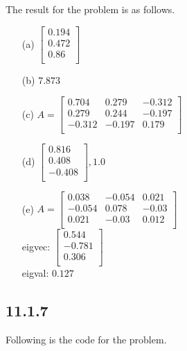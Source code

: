 \documentclass{article}
\begin{document}
The result for the problem is as follows.

\begin{enumerate}
    \item [(a)] $\begin{bmatrix} 0.194 \\ 0.472 \\ 0.86 \\  \end{bmatrix}$
    \item [(b)] $7.873$
    \item [(c)] 
    $A = \begin{bmatrix}
            0.704 & 0.279 & -0.312 \\
            0.279 & 0.244 & -0.197 \\
            -0.312 & -0.197 & 0.179 \\            
    \end{bmatrix}$
    \item [(d)] $\begin{bmatrix}  0.816 \\  0.408 \\ -0.408 \\ \end{bmatrix}, 1.0$
    \item [(e)]
    $A = \begin{bmatrix} 
            0.038 & -0.054 & 0.021 \\
            -0.054 & 0.078 & -0.03 \\
            0.021 & -0.03 & 0.012 \\
    \end{bmatrix}$ \\
    eigvec: $\begin{bmatrix} 0.544 \\ -0.781 \\ 0.306 \\ \end{bmatrix}$ \\
    eigval: $0.127$
\end{enumerate}

\subsection*{11.1.7}
Following is the code for the problem.
\end{document}
